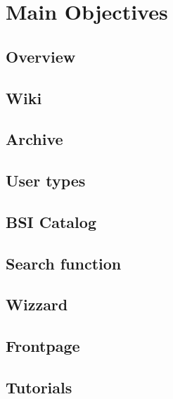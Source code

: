 \chapter{Main Objectives}
\section{Overview}
\section{Wiki}
\section{Archive}
\section{User types}
\section{BSI Catalog}
\section{Search function}
\section{Wizzard}
\section{Frontpage}
\section{Tutorials}
